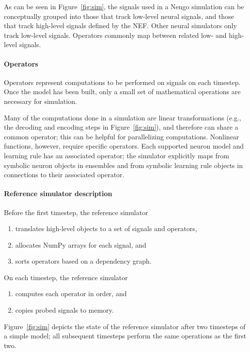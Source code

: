 \documentclass{frontiersSCNS}
\begin{document}
As can be seen in Figure~\ref{fig:sim},
the signals used in a Nengo simulation
can be conceptually grouped into
those that track low-level neural signals,
and those that track high-level signals
defined by the NEF.
Other neural simulators only track
low-level signals.
Operators commonly map
between related low- and high-level signals.

\clearpage

\paragraph{Operators}

Operators represent computations
to be performed on signals on each timestep.
Once the model has been built,
only a small set of mathematical
operations are necessary for simulation.

Many of the computations
done in a simulation
are linear transformations (e.g.,
the decoding and encoding steps
in Figure~\ref{fig:sim}),
and therefore can share a common operator;
this can be helpful for parallelizing computations.
Nonlinear functions, however,
require specific operators.
Each supported neuron model and learning rule
has an associated operator;
the simulator explicitly maps
from symbolic neuron objects in ensembles
and from symbolic learning rule objects
in connections to their associated operator.

\paragraph{Reference simulator description}

Before the first timestep, the reference simulator
\begin{enumerate}
  \item translates high-level objects to
    a set of signals and operators,
  \item allocates NumPy arrays for each signal, and
  \item sorts operators based on a dependency graph.
\end{enumerate}
On each timestep, the reference simulator
\begin{enumerate}
  \item computes each operator in order, and
  \item copies probed signals to memory.
\end{enumerate}
Figure~\ref{fig:sim} depicts
the state of the reference simulator
after two timesteps of a simple model;
all subsequent timesteps perform the same
operations as the first two.
\end{document}
